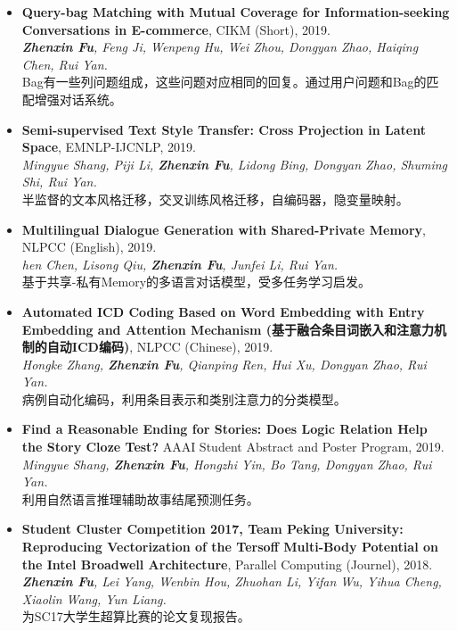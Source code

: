 \documentclass[letterpaper]{article}
\begin{document}
\begin{itemize}

\item \textbf{Query-bag Matching with Mutual Coverage for Information-seeking Conversations in E-commerce}, CIKM (Short), 2019. \\
{\it \textbf{Zhenxin Fu}, Feng Ji, Wenpeng Hu, Wei Zhou, Dongyan Zhao, Haiqing Chen, Rui Yan. } \\
Bag有一些列问题组成，这些问题对应相同的回复。通过用户问题和Bag的匹配增强对话系统。

\item \textbf{Semi-supervised Text Style Transfer: Cross Projection in Latent Space}, EMNLP-IJCNLP, 2019. \\
{\it Mingyue Shang, Piji Li, \textbf{Zhenxin Fu}, Lidong Bing, Dongyan Zhao, Shuming Shi, Rui Yan.} \\
半监督的文本风格迁移，交叉训练风格迁移，自编码器，隐变量映射。

\item \textbf{Multilingual Dialogue Generation with Shared-Private Memory}, NLPCC (English), 2019. \\
{\it hen Chen, Lisong Qiu, \textbf{Zhenxin Fu}, Junfei Li, Rui Yan. } \\
基于共享-私有Memory的多语言对话模型，受多任务学习启发。

\item \textbf{Automated ICD Coding Based on Word Embedding with Entry Embedding and Attention Mechanism (基于融合条目词嵌入和注意力机制的自动ICD编码)}, NLPCC (Chinese), 2019. \\
{\it Hongke Zhang, \textbf{Zhenxin Fu}, Qianping Ren, Hui Xu, Dongyan Zhao, Rui Yan.} \\
病例自动化编码，利用条目表示和类别注意力的分类模型。

\item \textbf{Find a Reasonable Ending for Stories: Does Logic Relation Help the Story Cloze Test?} AAAI Student Abstract and Poster Program, 2019. \\
{\it Mingyue Shang, \textbf{Zhenxin Fu}, Hongzhi Yin, Bo Tang, Dongyan Zhao, Rui Yan.} \\
利用自然语言推理辅助故事结尾预测任务。

\item \textbf{Student Cluster Competition 2017, Team Peking University: Reproducing Vectorization of the Tersoff Multi-Body Potential on the Intel Broadwell Architecture}, Parallel Computing (Journel), 2018. \\
{\it \textbf{Zhenxin Fu}, Lei Yang, Wenbin Hou, Zhuohan Li, Yifan Wu, Yihua Cheng, Xiaolin Wang, Yun Liang.} \\
为SC17大学生超算比赛的论文复现报告。


\end{itemize}
\end{document}
